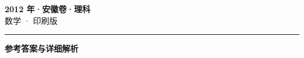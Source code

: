 \documentclass[zihao=5, a4paper]{ctexart}
\begin{document}
\begin{center}
  {\Large\bfseries 2012 年·安徽卷·理科}\\[4pt]
  {\large 数学 · 印刷版}
\end{center}
\medskip
{}

\par\bigskip\hrule\bigskip
{}
\Needspace{0.55\textheight}
\begin{center}{\large\bfseries 参考答案与详细解析}\end{center}
\smallskip

\end{document}
